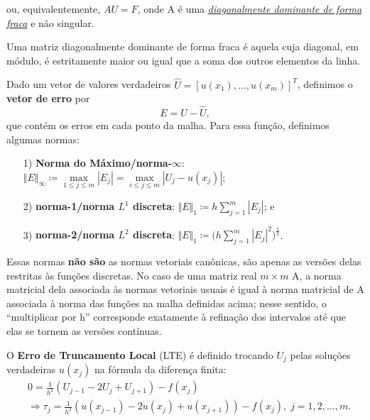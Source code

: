 \documentclass[../differential_methods.tex]{subfiles}
\begin{document}
ou, equivalentemente, \(A U = F\), onde A é uma \hyperlink{weak_diag}{\textit{diagonalmente dominante de forma fraca}} e não singular.
\begin{tcolorbox}[
		skin=enhanced,
		title=Lembrete!,
		after title={\hfill Diagonalmente Dominante de Forma Fraca},
		fonttitle=\bfseries,
		sharp corners=downhill,
		colframe=black,
		colbacktitle=yellow!75!white,
		colback=yellow!30,
		colbacklower=black,
		coltitle=black,
		drop large lifted shadow
	]
	Uma matriz \hypertarget{weak_diag}{diagonalmente dominante de forma fraca} é aquela cuja diagonal, em módulo, é estritamente maior ou igual que a soma dos outros elementos da linha.
\end{tcolorbox}

Dado um vetor de valores verdadeiros \(\hat{U} = [u(x_1), \dotsc , u(x_{m})]^{T}\), definimos o \textbf{vetor de erro} por
\[
	E = U - \hat{U},
\]
que contém os erros em cada ponto da malha. Para essa função, definimos algumas normas:
\begin{itemize}
	\item[1)] \textbf{Norma do Máximo/norma-\(\mathbf{\infty}\)}: \(\Vert E \Vert_{\infty}\coloneqq \max\limits_{1\leq j\leq m}| E_{j} | = \max\limits_{i\leq j\leq m}| U_{j}-u(x_{j}) |\);
	\item[2)] \textbf{norma-1/norma \(L^{1}\) discreta}: \(\Vert E \Vert_1 \coloneqq h \sum\limits_{j=1}^{m}| E_{j} |\); e
	\item[3)]\textbf{norma-2/norma \(L^{2}\) discreta}: \(\Vert E \Vert_1 \coloneqq \biggl(h \sum\limits_{j=1}^{m}| E_{j} |^{2}\biggr)^{\frac{1}{2}}\).
\end{itemize}
\begin{tcolorbox}[
		skin=enhanced,
		title=Observação,
		fonttitle=\bfseries,
		colframe=black,
		colbacktitle=cyan!75!white,
		colback=cyan!15,
		colbacklower=black,
		coltitle=black,
		drop fuzzy shadow,
	]
	Essas normas \textbf{não são} as normas vetoriais canônicas, são apenas as versões delas restritas às funções discretas.
	No caso de uma matriz real \(m\times m\) A, a norma matricial dela associada às normas vetoriais usuais é igual à norma matricial de A associada à norma das funções na malha definidas acima; nesse sentido, o ``multiplicar por h'' corresponde exatamente à refinação dos intervalos até que elas se tornem as versões contínuas.
\end{tcolorbox}
\begin{def*}
	O \textbf{Erro de Truncamento Local} (LTE) é definido trocando \(U_{j}\) pelas soluções verdadeiras \(u(x_{j})\) na fórmula da diferença finita:
	\begin{align*}
		 & 0 = \frac{1}{h^{2}}(U_{j-1}-2U_{j}+U_{j+1})-f(x_{j})                                                \\
		 & \Rightarrow \tau_{j}=\frac{1}{h^{2}}(u(x_{j-1})-2u(x_{j})+u(x_{j+1}))-f(x_{j}),\; j =1,2,\dotsc ,m.
	\end{align*}
\end{def*}
\end{document}
